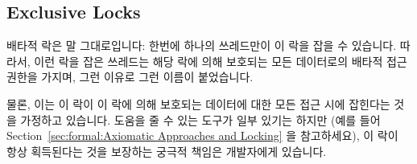 \subsection{Exclusive Locks}
\label{sec:locking:Exclusive Locks}

배타적 락은 말 그대로입니다: 한번에 하나의 쓰레드만이 이 락을 잡을 수 있습니다.
따라서, 이런 락을 잡은 쓰레드는 해당 락에 의해 보호되는 모든 데이터로의 배타적
접근 권한을 가지며, 그런 이유로 그런 이름이 붙었습니다.

물론, 이는 이 락이 이 락에 의해 보호되는 데이터에 대한 모든 접근 시에 잡힌다는
것을 가정하고 있습니다.
도움을 줄 수 있는 도구가 일부 있기는 하지만 (예를 들어
Section~\ref{sec:formal:Axiomatic Approaches and Locking} 을 참고하세요), 이
락이 항상 획득된다는 것을 보장하는 궁극적 책임은 개발자에게 있습니다.

